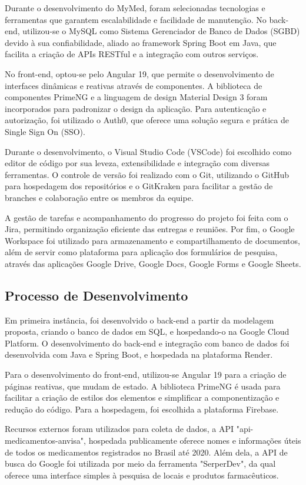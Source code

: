 \documentclass[
	article,			%
	12pt,				%
	oneside,			%
	a4paper,			%
    BIBLATEX,           %
	english,			%
	brazil,				%
	sumario=tradicional
	]{abntex2}
\newcommand\nomeprojeto{MyMed}
\begin{document}
Durante o desenvolvimento do \nomeprojeto, foram selecionadas tecnologias e ferramentas que garantem escalabilidade e facilidade de manutenção. No back-end, utilizou-se o MySQL como Sistema Gerenciador de Banco de Dados (SGBD) devido à sua confiabilidade, aliado ao framework Spring Boot em Java, que facilita a criação de APIs RESTful e a integração com outros serviços.

No front-end, optou-se pelo Angular 19, que permite o desenvolvimento de interfaces dinâmicas e reativas através de componentes. A biblioteca de componentes PrimeNG e a linguagem de design Material Design 3 foram incorporados para padronizar o design da aplicação. Para autenticação e autorização, foi utilizado o Auth0, que oferece uma solução segura e prática de Single Sign On (SSO).

Durante o desenvolvimento, o Visual Studio Code (VSCode) foi escolhido como editor de código por sua leveza, extensibilidade e integração com diversas ferramentas. O controle de versão foi realizado com o Git, utilizando o GitHub para hospedagem dos repositórios e o GitKraken para facilitar a gestão de branches e colaboração entre os membros da equipe.

A gestão de tarefas e acompanhamento do progresso do projeto foi feita com o Jira, permitindo organização eficiente das entregas e reuniões. Por fim, o Google Workspace foi utilizado para armazenamento e compartilhamento de documentos, além de servir como plataforma para aplicação dos formulários de pesquisa, através das aplicações Google Drive, Google Docs, Google Forms e Google Sheets.
	
\subsection{Processo de Desenvolvimento}

Em primeira instância, foi desenvolvido o back-end a partir da modelagem proposta, criando o banco de dados em SQL, e hospedando-o na Google Cloud Platform. O desenvolvimento do back-end e integração com banco de dados foi desenvolvida com Java e Spring Boot, e hospedada na plataforma Render.

Para o desenvolvimento do front-end, utilizou-se Angular 19 para a criação de páginas reativas, que mudam de estado. A biblioteca PrimeNG é usada para facilitar a criação de estilos dos elementos e simplificar a componentização e redução do código. Para a hospedagem, foi escolhida a plataforma Firebase.

Recursos externos foram utilizados para coleta de dados, a API "api-medicamentos-anvisa", hospedada publicamente oferece nomes e informações úteis de todos os medicamentos registrados no Brasil até 2020. Além dela, a API de busca do Google foi utilizada por meio da ferramenta "SerperDev", da qual oferece uma interface simples à pesquisa de locais e produtos farmacêuticos.
\end{document}
